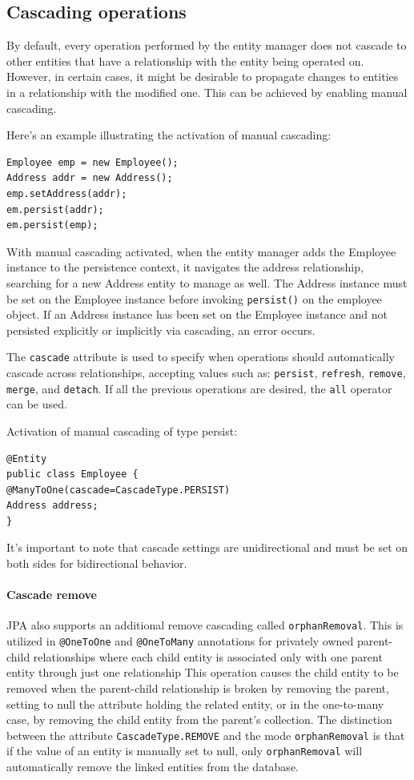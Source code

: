 \subsection{Cascading operations}
By default, every operation performed by the entity manager does not cascade to other entities that have a relationship with the entity being operated on.
However, in certain cases, it might be desirable to propagate changes to entities in a relationship with the modified one. 
This can be achieved by enabling manual cascading.
\begin{example}
    Here's an example illustrating the activation of manual cascading:
    \begin{lstlisting}[style=Java]
Employee emp = new Employee();
Address addr = new Address();
emp.setAddress(addr);
em.persist(addr);
em.persist(emp);
    \end{lstlisting}
    With manual cascading activated, when the entity manager adds the Employee instance to the persistence context, it navigates the address relationship, searching for a new Address entity to manage as well.
    The Address instance must be set on the Employee instance before invoking \texttt{persist()} on the employee object.  
    If an Address instance has been set on the Employee instance and not persisted explicitly or implicitly via cascading, an error occurs.
\end{example}
The \texttt{cascade} attribute is used to specify when operations should automatically cascade across relationships, accepting values such as: \texttt{persist}, \texttt{refresh}, \texttt{remove}, \texttt{merge}, and \texttt{detach}.
If all the previous operations are desired, the \texttt{all} operator can be used.
\begin{example}
    Activation of manual cascading of type persist: 
    \begin{lstlisting}[style=Java]
@Entity
public class Employee {
@ManyToOne(cascade=CascadeType.PERSIST)
Address address;
}
    \end{lstlisting}
\end{example}
It's important to note that cascade settings are unidirectional and must be set on both sides for bidirectional behavior.

\paragraph*{Cascade remove}
JPA also supports an additional remove cascading called \texttt{orphanRemoval}. 
This is utilized in \texttt{@OneToOne} and \texttt{@OneToMany} annotations for privately owned parent-child relationships where each child entity is associated only with one parent entity through just one relationship
This operation causes the child entity to be removed when the parent-child relationship is broken by removing the parent, setting to null the attribute holding the related entity, or in the one-to-many case, by removing the child entity from the parent's collection.
The distinction between the attribute \texttt{CascadeType.REMOVE} and the mode \texttt{orphanRemoval}  is that if the value of an entity is manually set to null, only \texttt{orphanRemoval} will automatically remove the linked entities from the database.